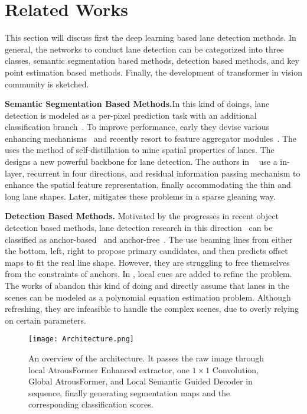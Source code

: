 \documentclass[preprint,12pt,review]{elsarticle}
\begin{document}
\section{Related Works}
\label{sec:relatedWorks}
This section will discuss first the deep learning based lane detection methods. In general, the networks to conduct lane detection can be categorized into three classes, semantic segmentation based methods, detection based methods, and key point estimation based methods. Finally, the development of transformer in vision community is sketched.

\textbf{Semantic Segmentation Based Methods.}In this kind of doings, lane detection is modeled as a per-pixel prediction task with an additional classification branch~\cite{rbnet, erfnet, liulane, SCNN, distillation, vanishing, gan, resa}. To improve performance, early they devise various enhancing mechanisms~\cite{rbnet, erfnet, liulane, gan, distillation} and recently resort to feature aggregator modules~\cite{SCNN, resa}.  The \cite{distillation} uses the method of self-distillation to mine spatial properties of lanes. The \cite{erfnet} designs a new powerful backbone for lane detection. The authors in ~\cite{SCNN} use a in-layer, recurrent in four directions, and residual information passing mechanism to enhance the spatial feature representation, finally accommodating the thin and long lane shapes. Later, \cite{resa} mitigates these problems in a sparse gleaning way.

\textbf{Detection Based Methods.} Motivated by the progresses in recent object detection based methods, lane detection research in this direction~\cite{linecnn,laneatt,polylanenet,lstr} can be classified as anchor-based~\cite{linecnn,laneatt} and anchor-free~\cite{polylanenet,lstr}. The \cite{linecnn, laneatt} use beaming lines from either the bottom, left, right to propose primary candidates, and then predicts offset maps to fit the real line shape. However, they are struggling to free themselves from the constraints of anchors. In \cite{laneatt}, local cues are added to refine the problem. The works of \cite{polylanenet,lstr} abandon this kind of doing and directly assume that lanes in the scenes can be modeled as a polynomial equation estimation problem. Although refreshing, they are infeasible to handle the complex scenes, due to overly relying on certain parameters.

\begin{figure*}[htbp]
	\centering
	\texttt{[image: Architecture.png]}
	\caption{An overview of the architecture. It passes the raw image through local AtrousFormer Enhanced extractor, one $1\times 1$ Convolution, Global AtrousFormer, and Local Semantic Guided Decoder in sequence, finally generating segmentation maps and the corresponding classification scores.}
	\label{arch}
\end{figure*}
\end{document}
